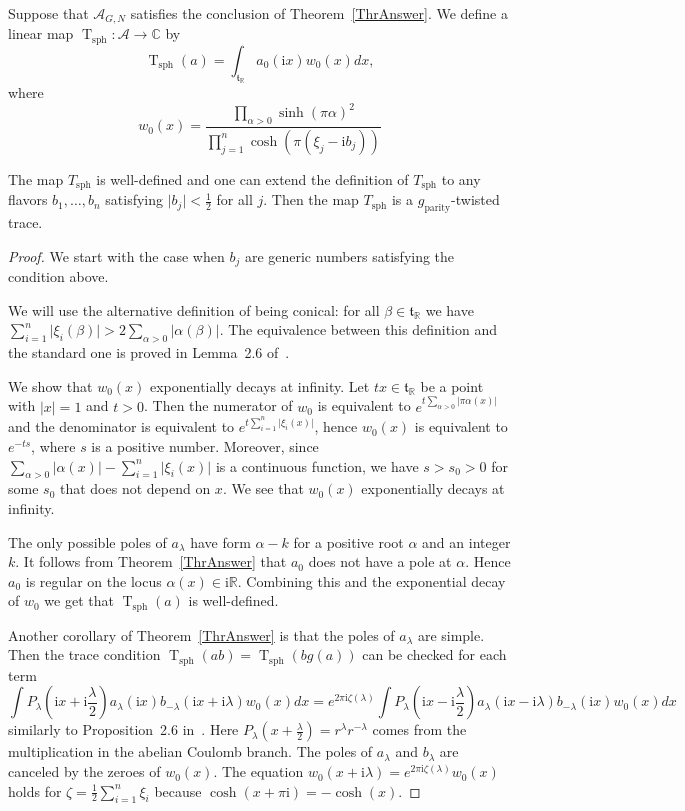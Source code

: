 \documentclass{article}
\newcommand{\R}{\mathbb{R}}
\renewcommand{\C}{\mathbb{C}}
\newcommand{\mf}{\mathfrak}
\newcommand{\mc}[1]{\mathcal{#1}}
\newcommand{\abs}[1]{\lvert #1\rvert}
\newcommand{\rmi}{\mathrm{i}}
\DeclareMathOperator{\sph}{sph}
\DeclareMathOperator{\T}{T}
\begin{document}
 \begin{defn}
     Suppose that $\mc{A}_{G,N}$ satisfies the conclusion of Theorem~\ref{ThrAnswer}. We define a linear map $\operatorname{T}_{\sph}\colon\mc{A}\to\C$ by
      \[\operatorname{T}_{\sph}(a)=\int_{\mf{t}_{\R}} a_0(\rmi x)w_0(x)dx,\] where 
      \[w_0(x)=\frac{\prod_{\alpha>0} \sinh(\pi\alpha)^2}{\prod_{j=1}^n \cosh(\pi(\xi_j-\rmi b_j))}\]
 \end{defn}
\begin{prop}
\label{PropTSph}
    The map $T_{\sph}$ is well-defined and one can extend the definition of $T_{\sph}$ to any flavors $b_1,\ldots,b_n$ satisfying $\abs{b_j}<\tfrac12$ for all $j$. Then the map $T_{\sph}$ is a $g_{\text{parity}}$-twisted trace.
\end{prop}
\begin{proof}
We start with the case when $b_j$ are generic numbers satisfying the condition above.

We will use the alternative definition of being conical: for all $\beta\in\mf{t}_{\R}$ we have $\sum_{i=1}^n\abs{\xi_i(\beta)}>2\sum_{\alpha>0}\abs{\alpha(\beta)}$. The equivalence between this definition and the standard one is proved in Lemma~2.6 of~\cite{GWTraces}.


We show that $w_0(x)$ exponentially decays at infinity. Let $tx\in\mf{t}_{\R}$ be a point with $\abs{x}=1$ and $t>0$. Then the numerator of $w_0$ is equivalent to $e^{t\sum_{\alpha>0}\abs{\pi\alpha(x)}}$ and the denominator is equivalent to $e^{t\sum_{i=1}^n \abs{\xi_i(x)}}$, hence $w_0(x)$ is equivalent to $e^{-ts}$, where $s$ is a positive number. Moreover, since $\sum_{\alpha>0}\abs{\alpha(x)}-\sum_{i=1}^n \abs{\xi_i(x)}$ is a continuous function, we have $s>s_0>0$ for some $s_0$ that does not depend on $x$. We see that $w_0(x)$ exponentially decays at infinity.

    The only possible poles of $a_{\lambda}$ have form $\alpha-k$ for a positive root $\alpha$ and an integer $k$. It follows from Theorem~\ref{ThrAnswer} that $a_0$ does not have a pole at $\alpha$. Hence $a_0$ is regular on the locus $\alpha(x)\in \rmi\R.$ Combining this and the exponential decay of $w_0$ we get that $\T_{\sph}(a)$ is well-defined.
    
    Another corollary of Theorem~\ref{ThrAnswer} is that the poles of $a_{\lambda}$ are simple. Then the trace condition $\operatorname{T}_{\mathrm{sph}}(ab)=\operatorname{T}_{\mathrm{sph}}(bg(a))$ can be checked for each term \[\int P_{\lambda}(\rmi x+\rmi\frac{\lambda}{2})a_{\lambda}(\rmi x)b_{-\lambda}(\rmi x+\rmi\lambda)w_0(x) dx= e^{2\pi\rmi\zeta(\lambda)}\int P_{\lambda}(\rmi x-\rmi\frac{\lambda}{2})a_{\lambda}(\rmi x-\rmi\lambda)b_{-\lambda}(\rmi x)w_0(x) dx\] similarly to Proposition~2.6 in~\cite{KAb}. Here $P_{\lambda}(x+\frac{\lambda}{2})=r^{\lambda}r^{-\lambda}$ comes from the multiplication in the abelian Coulomb branch. The poles of $a_{\lambda}$ and $b_{\lambda}$ are canceled by the zeroes of $w_0(x)$. The equation $w_0(x+\rmi\lambda)=e^{2\pi\rmi\zeta(\lambda)}w_0(x)$ holds for $\zeta=\tfrac12\sum_{i=1}^n\xi_i$ because $\cosh(x+\pi\rmi)=-\cosh(x).$
    

\end{proof}
\end{document}
